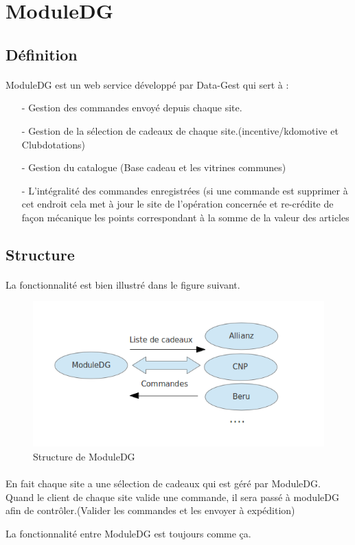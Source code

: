\section{ModuleDG}

\subsection{Définition}
\paragraph{}
ModuleDG est un web service développé par Data-Gest qui sert à :
\begin{itemize}
\item [-] Gestion des commandes envoyé depuis chaque site.
\item [-] Gestion de la sélection de cadeaux de chaque site.(incentive/kdomotive et Clubdotations)
\item [-] Gestion du catalogue (Base cadeau et les vitrines communes)
\item [-] L’intégralité des commandes enregistrées (si une commande est supprimer à cet endroit cela met à jour le site de l’opération concernée et re-crédite de façon mécanique les points correspondant à la somme de la valeur des articles\end{itemize}


\subsection{Structure}
\paragraph{}
La fonctionnalité est bien illustré dans le figure suivant.


\begin{figure}[hbtp]
\center
\includegraphics[width=15cm]{body/images/ModuleDG.png}
\caption{Structure de ModuleDG}
\end{figure}



\paragraph{}
En fait chaque site a une sélection de cadeaux qui est géré par  ModuleDG. Quand le client de chaque site valide une commande, il sera passé à moduleDG afin de contrôler.(Valider les commandes et les envoyer à expédition) 

La fonctionnalité entre ModuleDG est toujours comme ça.


